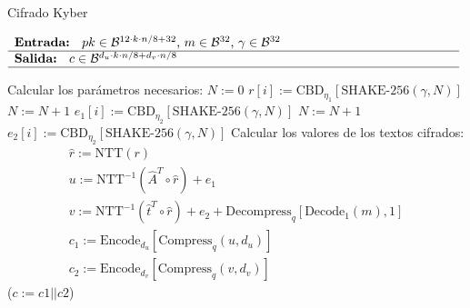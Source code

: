 \begin{algorithm}[H]
	\caption{Cifrado Kyber}
	$\begin{array}{p{\textwidth}}
		\textbf{Entrada: } \(pk\in \mathcal{B}^{12\cdot k\cdot n/8+32}\), \(m\in \mathcal{B}^{32}\), \(\gamma\in \mathcal{B}^{32}\)\\ 
		\hline
		\textbf{Salida: } \(c\in \mathcal{B}^{d_u\cdot k\cdot n/8+d_v\cdot n/8}\)\\ 
		\hline
	\end{array}$
	\begin{algorithmic}[1]
		\State Calcular los parámetros necesarios:
		\State \(N:=0\)
		\State $r[i]:= \text{CBD}_{\eta_1}[\text{SHAKE-256}(\gamma,N)]$ 
		\State $N:= N+1$
		\EndFor
		\State $e_1[i]:= \text{CBD}_{\eta_2}[\text{SHAKE-256}(\gamma,N)]$ 
		\State $N:= N+1$
		\EndFor
		\State \(e_2[i]:= \text{CBD}_{\eta_2}[\text{SHAKE-256}(\gamma,N)]\) 
		\State Calcular los valores de los textos cifrados:
		\begin{equation}
			\begin{array}{l}
				\hat{r}:=\text{NTT}(r)\\
				u:= \text{NTT}^{-1}(\hat{A}^T\circ \hat{r})+e_1\\
				v:=\text{NTT}^{-1}(\hat{t}^T\circ \hat{r})+e_2+ \text{Decompress}_q[\text{Decode}_1(m),1]\\
				c_1:=\text{Encode}_{d_u}[\text{Compress}_q(u,d_u)]\\
				c_2:=\text{Encode}_{d_v}[\text{Compress}_q(v,d_v)]
			\end{array}
		\end{equation}
		\State \Return (\(c:=c1||c2\))
	\end{algorithmic}
\end{algorithm}
\newpage

